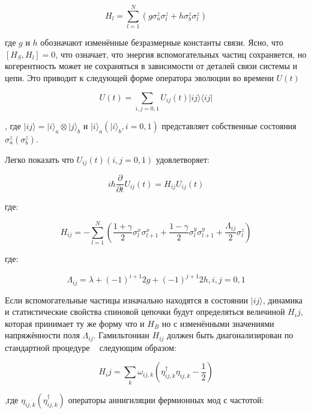 \documentclass[11pt]{article}
\begin{document}
\begin{equation}
H_l=\sum\limits_{l=1}^N(g\sigma_a^z\sigma_l^z+h\sigma_b^z\sigma_l^z)
\label{eq_2}
\end{equation}

где $g$ и $h$ обозначают изменённые безразмерные константы связи. Ясно, что $[H_S, H_l] = 0$, что означает, что энергия вспомогательных частиц сохраняется, но когерентность может не сохраняться в зависимости от деталей связи системы и цепи. Это приводит к следующей форме оператора эволюции во времени $U(t)$ 

\begin{equation}
U(t)=\sum\limits_{i,j=0,1}U_{ij}(t)|ij\rangle\langle ij|
\label{eq_3}
\end{equation}

, где $|ij\rangle = |i\rangle_a \otimes |j\rangle_b$ и $|i\rangle_a(|i\rangle_b,i=0,1)$ представляет собственные состояния $\sigma_a^z(\sigma_b^z)$.

Легко показать что $U_{ij}(t)(i,j=0,1)$ удовлетворяет:

\begin{equation}
i\hbar\frac{\partial}{\partial t}U_{ij}(t)=H_{ij}U_{ij}(t)
\label{eq_4}
\end{equation}

где:

\begin{equation*}
H_{ij}=-\sum\limits_{l=1}^N(\frac{1+\gamma}{2}\sigma_l^x\sigma_{l+1}^x+\frac{1-\gamma}{2}\sigma_l^y\sigma_{l+1}^y+\frac{\Lambda_{ij}}{2}\sigma_l^z)
\end{equation*}

где:

\begin{equation*}
\Lambda_{ij}=\lambda+(-1)^{i+1}2g+(-1)^{j+1}2h,i,j=0,1
\end{equation*}

Если вспомогательные частицы изначально находятся в состоянии $|ij\rangle$, динамика и статистические свойства спиновой цепочки будут определяться величиной $H_ij$, которая принимает ту же форму что и  $H_B$ но с изменёнными значениями напряжённости поля $\Lambda_{ij}$. Гамильтониан $H_{ij}$ должен быть диагонализирован по стандартной процедуре ~\cite{b21} следующим образом:

\begin{equation*}
H_ij=\sum\limits_k\omega_{ij,k}(\eta_{ij,k}^†\eta_{ij,k}-\frac{1}{2})
\end{equation*}

,где $\eta_{ij,k}(\eta_{ij,k}^†)$ операторы аннигиляции фермионных мод с частотой:
\end{document}

